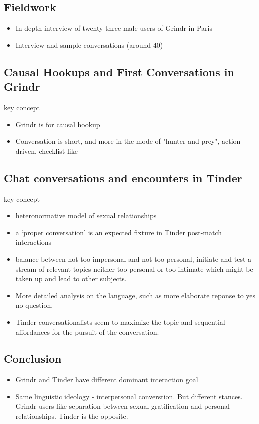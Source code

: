 \subsection{Fieldwork } 
    \begin{itemize} 
        \item In-depth interview of twenty-three male users of Grindr in Paris 
        \item Interview and sample conversations (around 40)
    \end{itemize}
    
\subsection{Causal Hookups and First Conversations in Grindr} 
key concept 
    \begin{itemize}
        \item Grindr is for causal hookup 
        \item Conversation is short, and more in the mode of "hunter and prey", action driven, checklist like 
    \end{itemize}

\subsection{Chat conversations and encounters in Tinder}
key concept 
    \begin{itemize}
        \item heteronormative model of sexual relationships
        \item a ‘proper conversation’ is an expected fixture in Tinder post-match interactions
        \item balance between not too impersonal and not too personal, initiate and test a stream of relevant topics neither too personal or too intimate which might be taken up and lead to other subjects.
        \item More detailed analysis on the language, such as more elaborate reponse to yes no question. 
        \item Tinder conversationalists seem to maximize the topic and sequential affordances for the pursuit of the conversation.
    \end{itemize}

\subsection{Conclusion}
    \begin{itemize}
        \item Grindr and Tinder have different dominant interaction goal 
        \item Same linguistic ideology - interpersonal converstion. But different stances. Grindr users like separation between sexual gratification and personal relationships. Tinder is the opposite. 
    \end{itemize}
    
